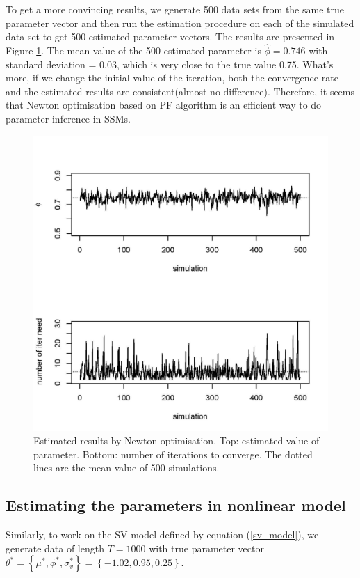 \documentclass[mstat,12pt]{unswthesis}  %
\numberwithin{equation}{section}
\begin{document}
\noindent To get a more convincing results, we generate 500 data sets from the same true parameter vector and then run the estimation procedure on each of the simulated data set to get 500 estimated parameter vectors. The results are presented in Figure \ref{fig:500test}. The mean value of the 500 estimated parameter is $\widehat{\phi}=0.746$ with standard deviation
= 0.03, which is very close to the true value 0.75. What's more, if we change the initial value of the iteration, both the convergence rate and the estimated results are consistent(almost no difference).
Therefore, it seems that Newton optimisation based on
PF algorithm is an efficient way to do parameter inference in SSMs.

\begin{figure}[H]
    \centering
    \includegraphics[width=1.0\linewidth]{500test.jpg}
    \caption
    {Estimated results by Newton optimisation. Top: estimated value of parameter. Bottom:  number of iterations to converge. The dotted lines are the mean value of 500 simulations.}
    \label{fig:500test}
\end{figure}


\subsection{Estimating the parameters in nonlinear model}
Similarly, to work on the SV model defined by equation (\ref{sv_model}),
we generate  data of length $T=1000$ with true parameter vector 
$\theta^{*}=\left\{\mu^{*}, \phi^{*}, \sigma_{v}^{*}\right\}
=\left\{-1.02,0.95,0.25\right\}$.\\
\end{document}
